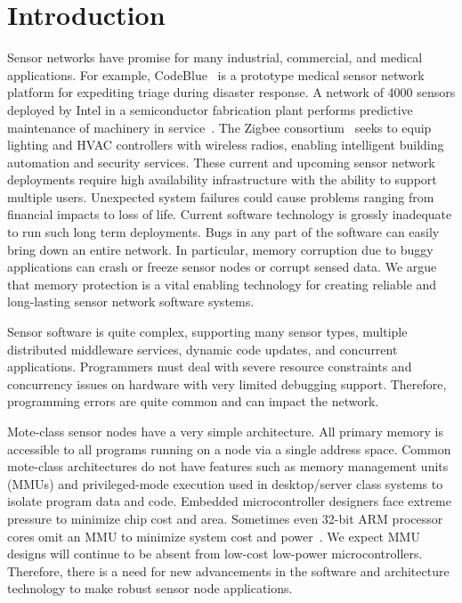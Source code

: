 \section{Introduction}
\label{sec:introduction}
%
Sensor networks have promise for many industrial, commercial, and
medical applications.
%
For example, CodeBlue~\cite{welsh04codeblue} is a prototype medical
sensor network platform for expediting triage during disaster
response.
%
A network of 4000 sensors deployed by Intel in a
semiconductor fabrication plant performs predictive maintenance of
machinery in service~\cite{intel05fabapp}.
%
The Zigbee consortium~\cite{zigbee} seeks to equip lighting and
HVAC controllers with wireless radios, enabling intelligent building
automation and security services.
%
These current and upcoming sensor network deployments require high
availability infrastructure with the ability to support multiple users.
%
%
Unexpected system failures could cause problems ranging from financial
impacts to loss of life.
%
Current software technology is grossly inadequate to run such long
term deployments.
%
Bugs in any part of the software can easily bring down an entire network.
%
In particular, memory corruption due to buggy applications can crash or
freeze sensor nodes or corrupt sensed data.
%
We argue that memory protection is a vital enabling technology for
creating reliable and long-lasting sensor network software systems.
%

Sensor software is quite complex, supporting 
%
many sensor types, multiple distributed
middleware services, dynamic code updates, and concurrent applications.
%
Programmers must deal with severe resource constraints and concurrency issues
%
on hardware with very limited debugging support.
%
Therefore, programming errors are quite common and can impact the network.


Mote-class sensor nodes have a very simple architecture.
%
All primary memory is accessible to all programs running
on a node via a single address space.
%
Common mote-class architectures do not have features such as memory
management units (MMUs) and privileged-mode execution used in
desktop/server class systems to isolate program data and code.
%
Embedded microcontroller designers face extreme pressure to minimize chip cost and area.
%
Sometimes even 32-bit ARM processor cores omit an MMU to minimize system cost and power~\cite{arm7tdmi}.
%
We expect MMU designs will continue to be absent from low-cost low-power
microcontrollers.
%
Therefore, there is a need for new advancements in the software and architecture
technology to make robust sensor node applications.
%
